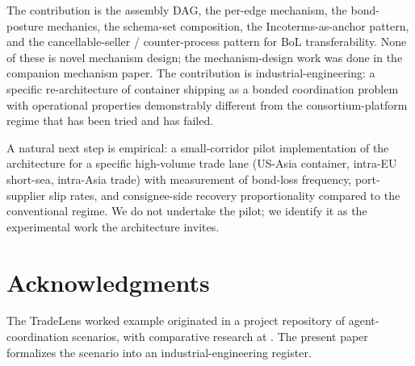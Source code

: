 \documentclass[11pt,a4paper]{article}
\theoremstyle{definition}
\theoremstyle{remark}
\begin{document}
The contribution is the assembly DAG, the per-edge mechanism,
the bond-posture mechanics, the schema-set composition, the
Incoterms-as-anchor pattern, and the
cancellable-seller / counter-process pattern for BoL
transferability. None of these is novel mechanism design; the
mechanism-design work was done in the companion mechanism paper.
The contribution is industrial-engineering: a specific
re-architecture of container shipping as a bonded coordination
problem with operational properties demonstrably different from
the consortium-platform regime that has been tried and has
failed.

A natural next step is empirical: a small-corridor pilot
implementation of the architecture for a specific high-volume
trade lane (US-Asia container, intra-EU short-sea, intra-Asia
trade) with measurement of bond-loss frequency, port-supplier
slip rates, and consignee-side recovery proportionality compared
to the conventional regime. We do not undertake the pilot; we
identify it as the experimental work the architecture invites.

\section*{Acknowledgments}
The TradeLens worked example originated in a project repository
of agent-coordination scenarios, with comparative research at
\citet{bol_research_2026}. The present paper formalizes the
scenario into an industrial-engineering register.
\end{document}
